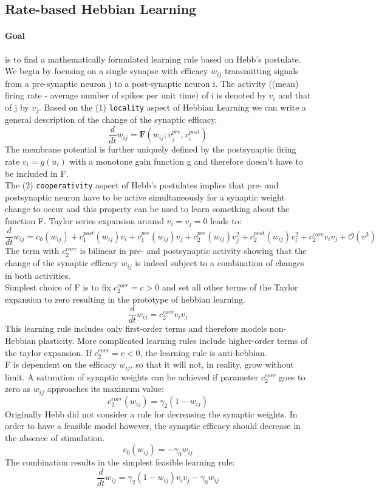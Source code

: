 \documentclass[11pt]{article}
\begin{document}
\subsection{Rate-based Hebbian Learning}
\paragraph{Goal} is to find a mathematically formulated learning rule based on Hebb's postulate.\\
We begin by focusing on a single synapse with efficacy $w_{ij}$ transmitting signals from a pre-synaptic neuron j to a post-synaptic neuron i. The activity ((mean) firing rate - average number of spikes per unit time) of i is denoted by $v_i$ and that of j by $v_j$. Based on the (1) \texttt{locality} aspect of Hebbian Learning we can write a general description of the change of the synaptic efficacy. 
\[
\frac{d}{dt}w_{ij}=\mathbf{F}(w_{ij}; v_j^{pre}, v_i^{post})
\]
The membrane potential is further uniquely defined by the postsynaptic firing rate $v_i = g(u_i)$ with a monotone gain function g and therefore doesn't have to be included in F.\\
The (2) \texttt{cooperativity} aspect of Hebb's postulates implies that pre- and postsynaptic neuron have to be active simultaneously for a synaptic weight change to occur and this property can be used to learn something about the function F. Taylor series expansion around $v_i=v_j=0$ leads to:
\[
\frac{d}{dt}w_{ij}=c_0(w_{ij})+c_1^{post}(w_{ij})v_i+c_1^{pre}(w_{ij})v_j+c_2^{pre}(w_{ij})v_j^2+c_2^{post}(w_{ij})v_i^2+c_2^{corr}v_i v_j+\mathcal{O}(v^3)
\]
The term with $c_2^{corr}$ is bilinear in pre- and postsynaptic activity showing that the change of the synaptic efficacy $w_{ij}$ is indeed subject to a combination of changes in both activities.\\
Simplest choice of F is to fix $c_2^{corr}=c>0$ and set all other terms of the Taylor expansion to zero resulting in the prototype of hebbian learning.\\
\[
\frac{d}{dt}w_{ij}=c_2^{corr}v_i v_j
\]
This learning rule includes only first-order terms and therefore models non-Hebbian plasticity. More complicated learning rules include higher-order terms of the taylor expansion. If $c_2^{corr}=c<0$, the learning rule is anti-hebbian.\\
F is dependent on the efficacy $w_{ij}$, so that it will not, in reality, grow without limit. A saturation of synaptic weights can be achieved if parameter $c_2^{corr}$ goes to zero as $w_{ij}$ approaches its maximum value:
\[
	c_2^{corr}(w_{ij})=\gamma_2(1-w_{ij})
\]
Originally Hebb did not consider a rule for decreasing the synaptic weights. In order to have a feasible model however, the synaptic efficacy should decrease in the absence of stimulation.\\
\[
	c_0(w_{ij})=-\gamma_0 w_{ij}
\]
The combination results in the simplest feasible learning rule:
\[
\frac{d}{dt}w_{ij}=\gamma_2(1-w_{ij})v_i v_j-\gamma_0 w_{ij}
\]
\end{document}
